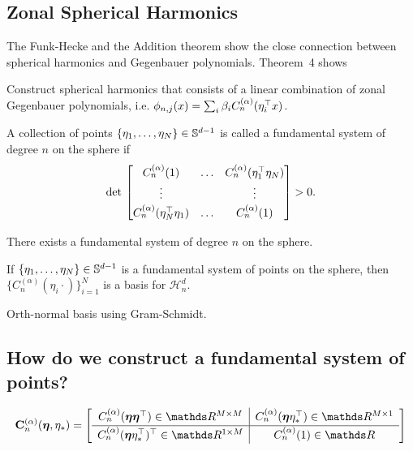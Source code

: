 \subsection{Zonal Spherical Harmonics}


The Funk-Hecke and the Addition theorem show the close connection between spherical harmonics and Gegenbauer polynomials. Theorem~4 shows

Construct spherical harmonics that consists of a linear combination of zonal Gegenbauer polynomials, i.e. $\phi_{n,j}(x) = \sum_i \beta_i C_n^{(\alpha)}(\eta_i^{\top} x)$.

\begin{definition}
    A collection of points $\{\eta_1, \ldots, \eta_N \} \in \mathbb{S}^{d-1}$ is called a fundamental system of degree $n$ on the sphere if
    \begin{equation}
        \textrm{det}\ 
        \begin{bmatrix}
            C_n^{(\alpha)}(1) & \ldots & C_n^{(\alpha)}(\eta_1\transpose\eta_N) \\
            \vdots & & \vdots \\
            C_n^{(\alpha)}(\eta_N\transpose\eta_1) & \ldots & C_n^{(\alpha)}(1)
        \end{bmatrix} > 0.
    \end{equation}
\end{definition}

\begin{lemma}
    There exists a fundamental system of degree $n$ on the sphere.
\end{lemma}


\begin{theorem}
    If $\{\eta_1, \ldots, \eta_N \} \in \mathbb{S}^{d-1}$ is a fundamental system of points on the sphere, then $\{C_n^{(\alpha)}(\eta_i \cdot)\}_{i=1}^N$ is a basis for $\mathcal{H}_n^d$.
\end{theorem}

Orth-normal basis using Gram-Schmidt.

\subsection{How do we construct a fundamental system of points?}

\begin{equation}
    \renewcommand\arraystretch{1.3}
    \MC_n^{(\alpha)}(\veta, \eta_{*}) =
    \left[
        \begin{array}{c|c}
          C_n^{(\alpha)}(\veta\veta\transpose) \in \Reals^{M \times M} & C_n^{(\alpha)}(\veta\eta_{*}\transpose) \in \Reals^{M \times 1} \\
          \hline
          C_n^{(\alpha)}(\veta\eta_{*}\transpose)\transpose \in \Reals^{1 \times M} & C_n^{(\alpha)}(1) \in \Reals
        \end{array}
    \right]
\end{equation}

